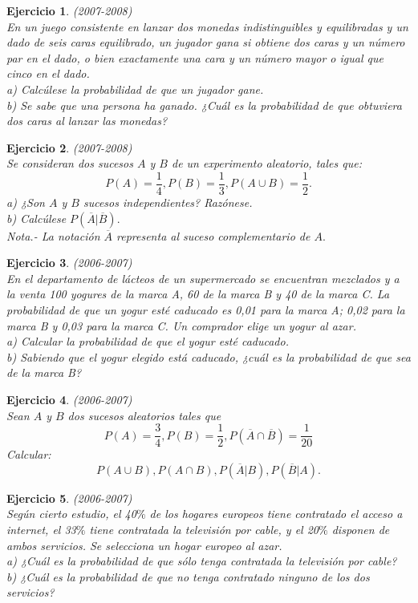 \documentclass[12pt, a4paper]{amsart}
\newtheorem{ejer}{Ejercicio}
\begin{document}
\begin{ejer}\em (2007-2008)\\
En un juego consistente en lanzar dos monedas indistinguibles y equilibradas y un dado de seis caras equilibrado, un jugador gana si obtiene dos caras y un número par en el dado, o bien exactamente una cara y un número mayor o igual que cinco en el dado.\\
a) Calcúlese la probabilidad de que un jugador gane.\\
b) Se sabe que una persona ha ganado. ¿Cuál es la probabilidad de que obtuviera dos caras al lanzar las monedas?
\end{ejer}

\begin{ejer}\em (2007-2008)\\%
Se consideran dos sucesos $A$ y $B$ de un experimento aleatorio, tales que:
\[P(A)=\frac{1}{4}, P(B)=\frac{1}{3}, P(A\cup B)=\frac{1}{2}.\]
a) ¿Son $A$ y $B$ sucesos independientes? Razónese.\\
b) Calcúlese $P(\overline{A}|\overline{B}).$\\
Nota.- La notación $\overline{A}$ representa al suceso complementario de $A.$
\end{ejer}

\begin{ejer}\em (2006-2007)\\%
En el departamento de lácteos de un supermercado se encuentran mezclados y a la venta 100 yogures de la marca A, 60 de la marca B y 40 de la marca C. La probabilidad de que un yogur esté caducado es 0,01 para la marca A; 0,02 para la marca B y 0,03 para la marca C. Un comprador elige un yogur al azar.\\
a) Calcular la probabilidad de que el yogur esté caducado.\\
b) Sabiendo que el yogur elegido está caducado, ¿cuál es la probabilidad de que sea de la marca B?
\end{ejer}

\begin{ejer}\em (2006-2007)\\%
Sean $A$ y $B$ dos sucesos aleatorios tales que
\[P(A)=\frac{3}{4}, P(B)=\frac{1}{2}, P(\overline{A}\cap \overline{B})=\frac{1}{20}\]
Calcular:
\[P(A\cup B), P(A\cap B), P(\overline{A}|B), P(\overline{B}|A).\]
\end{ejer}

\begin{ejer}\em (2006-2007)\\%
Según cierto estudio, el 40$\%$ de los hogares europeos tiene contratado el acceso a internet, el 33$\%$ tiene contratada la televisión por cable, y el 20$\%$ disponen de ambos servicios. Se selecciona un hogar europeo al azar.\\
a) ¿Cuál es la probabilidad de que sólo tenga contratada la televisión por cable?\\
b) ¿Cuál es la probabilidad de que no tenga contratado ninguno de los dos servicios?
\end{ejer}
\end{document}
